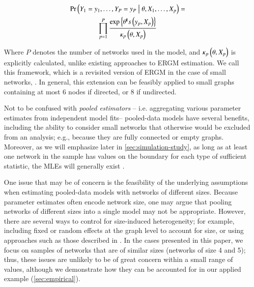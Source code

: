 \documentclass[review, nonatbib,doubleblind]{elsarticle/elsarticle}
\begin{document}
\begin{multline}
    \label{eq:ergm-pooled}
    \Prcond{\Adjmat_1 = \adjmat_1, \dots, \Adjmat_P = \adjmat_P}{\params, \Indepvar_1, \dots, \Indepvar_p} = \\
    \prod_{p=1}^P\frac{%
    		\exp{\transpose{\params}\sufstats{\adjmat_p, \Indepvar_p}}%
    	}{
    		\kappa_p\left(\params, \Indepvar_p\right)
    	}
\end{multline}

\noindent Where $P$ denotes the number of networks used in the model, and $\kappa_p\left(\theta, X_p\right)$ is explicitly calculated, unlike existing approaches to ERGM estimation. We call this framework, which is a revisited version of ERGM in the case of small networks, \ergmito{}. In general, this extension can be feasibly applied to small graphs containing at most 6 nodes if directed, or 8 if undirected. %

Not to be confused with \textit{pooled estimators} -- i.e. aggregating various parameter estimates from independent model fits-- pooled-data models have several benefits, including the ability to consider small networks that otherwise would be excluded from an analysis; e.g., because they are fully connected or empty graphs. Moreover, as we will emphasize later in \autoref{sec:simulation-study}, as long as at least one network in the sample has values on the boundary for each type of sufficient statistic, the MLEs will generally exist \cite[see][]{Handcock2003}.

One issue that may be of concern is the feasibility of the underlying assumptions when estimating pooled-data models with networks of different sizes. Because parameter estimates often encode network size, one may argue that pooling networks of different sizes into a single model may not be appropriate. However, there are several ways to control for size-induced heterogeneity; for example, including fixed or random effects at the graph level to account for size, or using approaches such as those described in \cite{Krivitsky2011,Krivitsky2015,Butts2015}. In the cases presented in this paper, we focus on samples of networks that are of similar sizes (networks of size 4 and 5); thus, these issues are unlikely to be of great concern within a small range of values, although we demonstrate how they can be accounted for in our applied example (\autoref{sec:empirical}).
\end{document}
